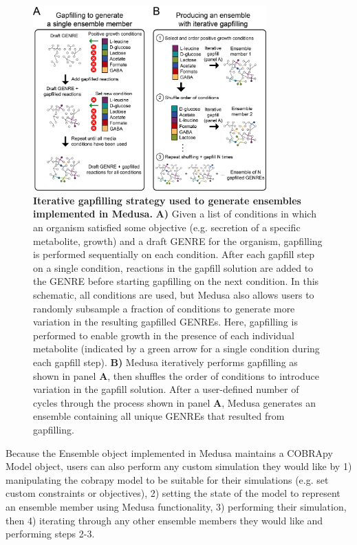 \documentclass[11pt,twocolumn,notitlepage,openany,twoside]{book}
\begin{document}
\begin{refsection}
\begin{figure}[tb]
\centering
\includegraphics[width=0.8\textwidth]{ch4_fig4}
\caption[ Iterative gapfilling strategy used to generate ensembles implemented in Medusa.]{\textbf{ Iterative gapfilling strategy used to generate ensembles implemented in Medusa.}  \textbf{A)} Given a list of conditions in which an organism satisfied some objective (e.g. secretion of a specific metabolite, growth) and a draft GENRE for the organism, gapfilling is performed sequentially on each condition. After each gapfill step on a single condition, reactions in the gapfill solution are added to the GENRE before starting gapfilling on the next condition. In this schematic, all conditions are used, but Medusa also allows users to randomly subsample a fraction of conditions to generate more variation in the resulting gapfilled GENREs. Here, gapfilling is performed to enable growth in the presence of each individual metabolite (indicated by a green arrow for a single condition during each gapfill step). \textbf{B)} Medusa iteratively performs gapfilling as shown in panel \textbf{A}, then shuffles the order of conditions to introduce variation in the gapfill solution. After a user-defined number of cycles through the process shown in panel \textbf{A}, Medusa generates an ensemble containing all unique GENREs that resulted from gapfilling.}
\end{figure}

Because the Ensemble object implemented in Medusa maintains a COBRApy Model object, users can also perform any custom simulation they would like by 1) manipulating the cobrapy model to be suitable for their simulations (e.g. set custom constraints or objectives), 2) setting the state of the model to represent an ensemble member using Medusa functionality, 3) performing their simulation, then 4) iterating through any other ensemble members they would like and performing steps 2-3.


\end{refsection}
\end{document}
